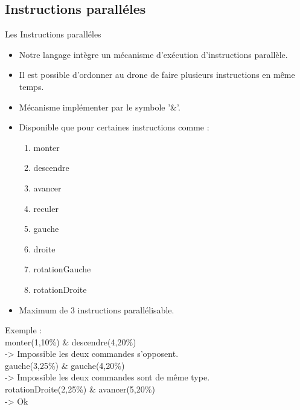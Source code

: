 \documentclass{bredelebeamer}
\begin{document}
	\subsection{Instructions paralléles} 
\begin{frame}{Les Instructions paralléles} 
\begin{itemize}
\item Notre langage intègre un mécanisme d'exécution d'instructions parallèle.
\item Il est possible d'ordonner au drone de faire plusieurs instructions en même temps. 
\item Mécanisme implémenter par le symbole '\&'. \pause
\item Disponible que pour certaines instructions comme :  
	\begin{enumerate}
		\item monter
		\item descendre
		\item avancer
		\item reculer
		\item gauche
		\item droite
		\item rotationGauche
		\item rotationDroite
	\end{enumerate}	\pause
\item Maximum de 3 instructions parallélisable.
\end{itemize}
\begin{tabbing}
Exemple : \=\\
	\>\color{Framarouge}monter(\color{black}1\color{Framarouge},\color{Framagris}10\%\color{Framarouge}) \& 
	\color{Framarouge}descendre(\color{black}4\color{Framarouge},\color{Framagris}20\%\color{Framarouge})\\ \pause
	\color{black}\>-> Impossible les deux commandes s'opposent.\\
	\>\color{Framarouge}gauche(\color{black}3\color{Framarouge},\color{Framagris}25\%\color{Framarouge}) \& 
	\color{Framarouge}gauche(\color{black}4\color{Framarouge},\color{Framagris}20\%\color{Framarouge})\\ \pause
	\color{black}\>-> Impossible les deux commandes sont de même type.\\
	\>\color{Framarouge}rotationDroite(\color{black}2\color{Framarouge},\color{Framagris}25\%\color{Framarouge}) \& 
	\color{Framarouge}avancer(\color{black}5\color{Framarouge},\color{Framagris}20\%\color{Framarouge})\\ \pause
	\color{black}\>-> Ok
\end{tabbing}
\end{frame}
	
\end{document}
